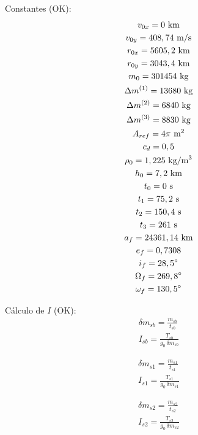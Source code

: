 \documentclass[10pt,a4paper]{article}
\begin{document}
	Constantes (OK):
	\begin{equation}
		\begin{gathered}
			v_{0x} = 0 \text{ km} \\
			v_{0y} = 408,74 \text{ m/s} \\
			r_{0x} = 5605,2 \text{ km} \\
			r_{0y} = 3043,4 \text{ km} \\
			m_0 = 301454 \text{ kg} \\
			\Delta m^{(1)} = 13680 \text{ kg} \\
			\Delta m^{(2)} = 6840 \text{ kg} \\
			\Delta m^{(3)} = 8830 \text{ kg} \\
			A_{ref} = 4 \pi \text{ m$^2$} \\
			c_d = 0,5 \\
			\rho_0 = 1,225 \text{ kg/m$^3$} \\
			h_0 = 7,2 \text{ km} \\
			t_0 = 0 \text{ s} \\
			t_1 = 75,2 \text{ s} \\
			t_2 = 150,4 \text{ s} \\
			t_3 = 261 \text{ s} \\
			a_f = 24361,14 \text{ km} \\
			e_f = 0,7308 \\
			i_f = 28,5 \degree \\
			\Omega_f = 269,8 \degree \\
			\omega_f = 130,5 \degree \\
		\end{gathered}
	\end{equation}

	Cálculo de $ I $ (OK):
	\begin{equation}
		\begin{gathered}
			\delta m_{sb} = \frac{m_{sb}}{t_{sb}} \\
			I_{sb} = \frac{T_{sb}}{g_0 \, \delta m_{sb}}
		\end{gathered}
	\end{equation}
	
	\begin{equation}
		\begin{gathered}
			\delta m_{s1} = \frac{m_{s1}}{t_{s1}} \\
			I_{s1} = \frac{T_{s1}}{g_0 \, \delta m_{s1}}
		\end{gathered}
	\end{equation}
	
	\begin{equation}
		\begin{gathered}
			\delta m_{s2} = \frac{m_{s2}}{t_{s2}} \\
			I_{s2} = \frac{T_{s2}}{g_0 \, \delta m_{s2}}
		\end{gathered}
	\end{equation}
\end{document}
